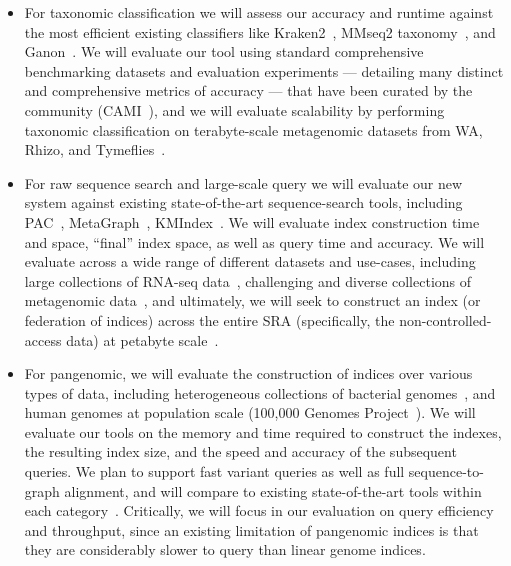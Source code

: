 \begin{itemize}%
  \item For taxonomic classification we will assess our accuracy and runtime against the most efficient existing classifiers like Kraken2~\cite{wood2019improved}, MMseq2 taxonomy~\cite{Mirdita_2021}, and Ganon~\cite{Piro_2020}. We will evaluate our tool using standard comprehensive benchmarking datasets and evaluation experiments --- detailing many distinct and comprehensive metrics of accuracy --- that have been curated by the community (CAMI~\cite{Meyer_2022}), and we will evaluate scalability by performing taxonomic classification on terabyte-scale metagenomic datasets from WA, Rhizo, and Tymeflies~\cite{hofmeyr2020terabase}. 
  \item For raw sequence search and large-scale query we will evaluate our new system against existing state-of-the-art sequence-search tools, including PAC~\cite{Marchet_2023}, MetaGraph~\cite{Karasikov2020}, KMIndex~\cite{Lemane_2023}. We will evaluate index construction time and space, ``final'' index space, as well as query time and accuracy.  We will evaluate across a wide range of different datasets and use-cases, including large collections of RNA-seq data~\cite{Lonsdale_2013}, challenging and diverse collections of metagenomic data~\cite{Sunagawa_2020}, and ultimately, we will seek to construct an index (or federation of indices) across the entire SRA (specifically, the non-controlled-access data) at petabyte scale~\cite{kodama2012sequence}. 
  \item For pangenomic, we will evaluate the construction of indices over various types of data, including heterogeneous collections of bacterial genomes~\cite{Blackwell_2021}, and human genomes at population scale (100,000 Genomes Project~\cite{1002021100}). We will evaluate our tools on the memory and time required to construct the indexes, the resulting index size, and the speed and accuracy of the subsequent queries. We plan to support fast variant queries as well as full sequence-to-graph alignment, and will compare to existing state-of-the-art tools within each category~\cite{garrison2018variation,pandey2021variantstore,Chandra_2023,Ivanov_2022,Hickey_2023}. Critically, we will focus in our evaluation on query efficiency and throughput, since an existing limitation of pangenomic indices is that they are considerably slower to query than linear genome indices.

\end{itemize}
